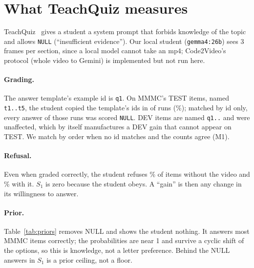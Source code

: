 \section{What TeachQuiz measures}\label{sec:audit}


TeachQuiz~\cite{code2video} gives a student a system prompt that forbids knowledge of the topic and allows
\texttt{NULL} (``insufficient evidence''). Our local student (\texttt{gemma4:26b}) sees 3 frames per section, since a
local model cannot take an mp4; Code2Video's protocol (whole video to Gemini) is implemented but not run here.

\paragraph{Grading.} The answer template's example id is \texttt{q1}. On MMMC's TEST items, named \texttt{t1..t5},
the student copied the template's ids in \OrderRuns{} of \AllRuns{} runs (\OrderShare\%); matched by id only, every
answer of those runs was scored \texttt{NULL}. DEV items are named \texttt{q1..} and were unaffected, which by itself
manufactures a DEV gain that cannot appear on TEST. We match by order when no id matches and the counts agree (M1).

\paragraph{Refusal.} Even when graded correctly, the student refuses \NullNoVideo\% of items without the video and
\NullWithVideo\% with it. $S_1$ is zero because the student obeys. A ``gain'' is then any change in its willingness to
answer.

\paragraph{Prior.} Table~\ref{tab:priors} removes NULL and shows the student nothing. It answers most MMMC items
correctly; the probabilities are near 1 and survive a cyclic shift of the options, so this is knowledge, not a letter
preference. Behind the NULL answers in $S_1$ is a prior ceiling, not a floor.



